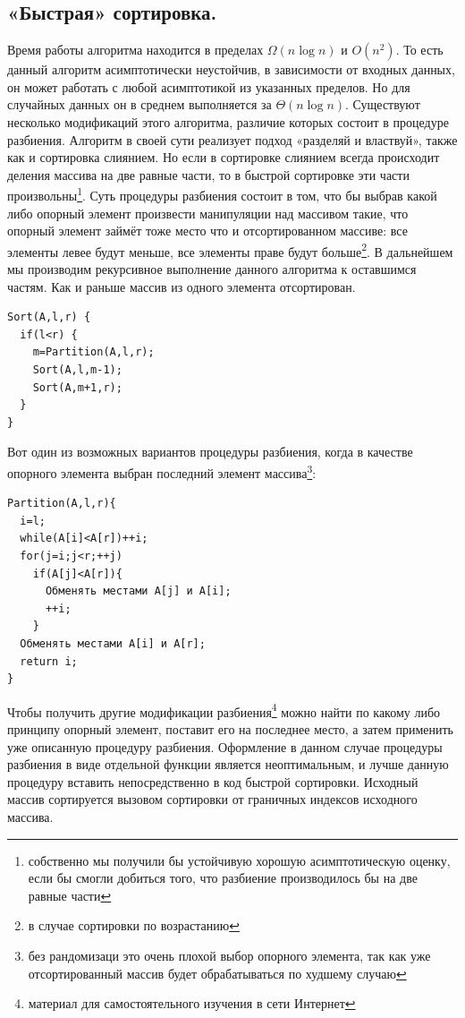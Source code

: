 \documentclass[12pt]{article}
\begin{document}
\subsection{«Быстрая» сортировка.} Время работы алгоритма находится в пределах $ \Omega{}(n\log{}n) $ и $ O(n^{2}) $. То есть данный алгоритм асимптотически неустойчив, в зависимости от входных данных, он может работать с любой асимптотикой из указанных пределов. Но для случайных данных он в среднем выполняется за $ \Theta(n\log{}n) $.
Существуют несколько модификаций этого алгоритма, различие которых состоит в процедуре разбиения. Алгоритм в своей сути реализует подход «разделяй и властвуй», также как и сортировка слиянием. Но если в сортировке слиянием всегда происходит деления массива на две равные части, то в быстрой сортировке эти части произвольны\footnote{собственно мы получили бы устойчивую хорошую асимптотическую оценку, если бы смогли добиться того, что  разбиение производилось бы на две равные части}. Суть процедуры разбиения состоит в том, что бы выбрав какой либо опорный элемент произвести манипуляции над массивом такие, что опорный элемент займёт тоже место что и отсортированном массиве: все элементы левее будут меньше, все элементы праве будут больше\footnote{в случае сортировки по возрастанию}. В дальнейшем мы производим рекурсивное выполнение данного алгоритма к оставшимся частям. Как и раньше массив из одного элемента отсортирован.
\begin{verbatim}
Sort(A,l,r) {
  if(l<r) {
    m=Partition(A,l,r);
    Sort(A,l,m-1);
    Sort(A,m+1,r);
  }
}
\end{verbatim}

Вот один из возможных вариантов процедуры разбиения, когда в качестве опорного элемента выбран последний элемент массива\footnote{без рандомизаци это очень плохой выбор опорного элемента, так как уже отсортированный массив будет обрабатываться по худшему случаю}:
\begin{verbatim}
Partition(A,l,r){
  i=l;
  while(A[i]<A[r])++i;
  for(j=i;j<r;++j)
    if(A[j]<A[r]){
      Обменять местами A[j] и A[i];
      ++i;
    }
  Обменять местами A[i] и A[r];
  return i;
}
\end{verbatim}
Чтобы получить другие модификации разбиения\footnote{материал для самостоятельного изучения в сети Интернет} можно найти по какому либо принципу опорный элемент, поставит его на последнее место, а затем применить уже описанную процедуру разбиения. Оформление в данном случае процедуры разбиения в виде отдельной функции является неоптимальным, и лучше данную процедуру вставить непосредственно в код быстрой сортировки. Исходный массив сортируется вызовом сортировки от граничных индексов исходного массива.
\end{document}
